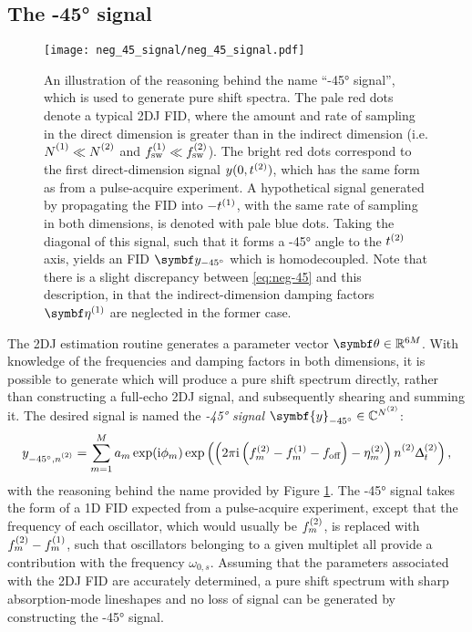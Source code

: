 \subsection{The \ang{-45} signal}
\begin{figure}
    \centering
    \texttt{[image: neg\_45\_signal/neg\_45\_signal.pdf]}
    \caption[
        An illustration of the reasoning behind the name ``\ang{-45}
        signal'' used to generate pure shift spectra.
    ]{
        An illustration of the reasoning behind the name ``\ang{-45}
        signal'', which is used to generate pure shift spectra. The pale red
        dots denote
        a typical \ac{2DJ} \ac{FID}, where
        the amount and rate of sampling in the direct dimension is greater than
        in the indirect dimension (i.e. $\None \ll \Ntwo$ and $f_{\mathrm{sw}}^{(1)} \ll
        f_{\mathrm{sw}}^{(2)}$). The bright red dots correspond to the first direct-dimension
        signal $y(0,t^{(2)})$, which has the same form as
         from a pulse-acquire experiment. A hypothetical signal
        generated by propagating the \ac{FID} into $-t^{(1)}$, with the same rate
        of sampling in both dimensions, is denoted with pale blue dots. Taking
        the diagonal of this signal, such that it forms a \ang{-45} angle to the
        $t^{(2)}$ axis, yields an \ac{FID} $\by_{\ang{-45}}$  which is
        homodecoupled. Note that there is a slight discrepancy
        between \eqref{eq:neg-45} and this description, in that the
        indirect-dimension damping factors $\bdetaone$ are neglected in the
        former case.
    }
    \label{fig:neg-45}
\end{figure}
The \ac{2DJ} estimation routine generates a parameter vector $\bth \in
\mathbb{R}^{6M}$. With
knowledge of the frequencies and damping factors in both dimensions, it is
possible to generate  which will produce a pure shift spectrum
directly, rather than constructing a full-echo \ac{2DJ} signal, and
subsequently shearing and summing it. The desired signal is named
the \emph{\ang{-45} signal} $\symbf{y}_{\ang{-45}} \in \mathbb{C}^{\Ntwo}$:
\begin{equation}
    y_{\ang{-45},\ntwo} =
        \sum_{m=1}^{M} a_m \exp (\iu \phi_m)
        \exp\left(\left(2 \pi \iu \left(\ftwo_m - \fone_m - \foff\right)
                - \etatwo_m
            \right) \ntwo \Dttwo
        \right),
    \label{eq:neg-45}
\end{equation}
with the reasoning behind the name provided by Figure \ref{fig:neg-45}.
The \ang{-45} signal
takes the form of a \ac{1D} \ac{FID} expected from a pulse-acquire experiment,
except that the frequency of each oscillator, which would usually be $f^{(2)}_m$,
is replaced with $f^{(2)}_m - f^{(1)}_m$, such that oscillators belonging to a
given multiplet all provide a contribution with the frequency $\omega_{0,s}$.
Assuming that the parameters associated with the \ac{2DJ}
\ac{FID} are accurately determined, a pure shift spectrum with sharp
absorption-mode lineshapes and no loss of signal can be generated by
constructing the \ang{-45} signal.


